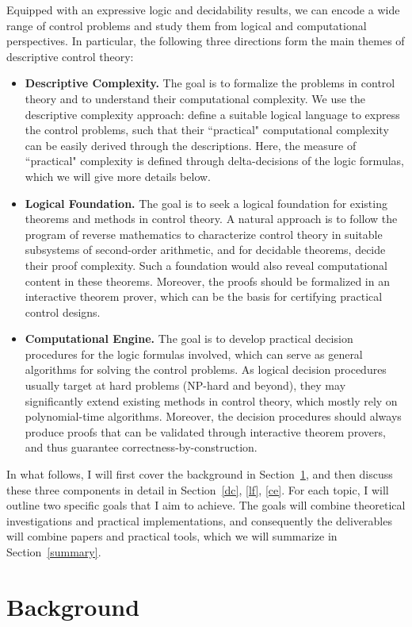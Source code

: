\documentclass[10pt]{article}
\theoremstyle{definition}
\begin{document}
Equipped with an expressive logic and decidability results, we can encode a wide range of control problems and study them from logical and computational perspectives. In particular, the following three directions form the main themes of descriptive control theory: 
\begin{itemize}
\item {\bf Descriptive Complexity.} The goal is to formalize the problems in control theory and to understand their computational complexity. We use the descriptive complexity approach: define a suitable logical language to express the control problems, such that their ``practical" computational complexity can be easily derived through the descriptions. Here, the measure of ``practical" complexity is defined through delta-decisions of the logic formulas, which we will give more details below. 
\item {\bf Logical Foundation.} The goal is to seek a logical foundation for existing theorems and methods in control theory. A natural approach is to follow the program of reverse mathematics to characterize control theory in suitable subsystems of second-order arithmetic, and for decidable theorems, decide their proof complexity. Such a foundation would also reveal computational content in these theorems. Moreover, the proofs should be formalized in an interactive theorem prover, which can be the basis for certifying practical control designs. 
\item {\bf Computational Engine.} The goal is to develop practical decision procedures for the logic formulas involved, which can serve as general algorithms for solving the control problems. As logical decision procedures usually target at hard problems (NP-hard and beyond), they may significantly extend existing methods in control theory, which mostly rely on polynomial-time algorithms. Moreover, the decision procedures should always produce proofs that can be validated through interactive theorem provers, and thus guarantee correctness-by-construction.
\end{itemize}
In what follows, I will first cover the background in Section~\ref{back}, and then discuss these three components in detail in Section~\ref{dc}, \ref{lf}, \ref{ce}. For each topic, I will outline two specific goals that I aim to achieve. The goals will combine theoretical investigations and practical implementations, and consequently the deliverables will combine papers and practical tools, which we will summarize in Section~\ref{summary}. 

\section{Background}\label{back}
\end{document}
